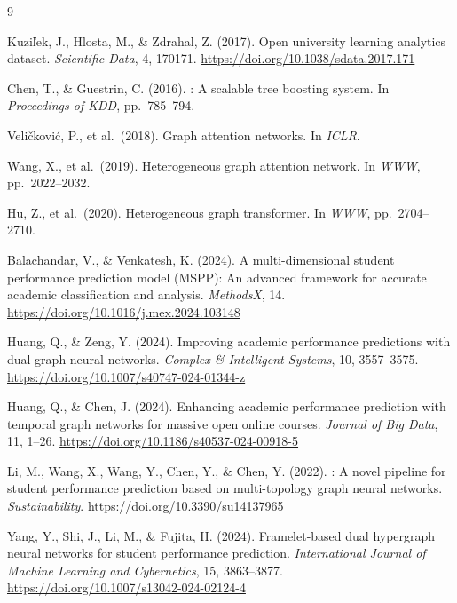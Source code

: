 \documentclass[sigconf]{acmart}
\begin{document}
\begin{thebibliography}{9}

Kuzi\v{l}ek, J., Hlosta, M., \& Zdrahal, Z. (2017).
\newblock Open university learning analytics dataset.
\newblock \emph{Scientific Data}, 4, 170171.
\newblock \url{https://doi.org/10.1038/sdata.2017.171}

Chen, T., \& Guestrin, C. (2016).
: A scalable tree boosting system.
\newblock In \emph{Proceedings of KDD}, pp.\ 785--794.

Veli\v{c}kovi\'{c}, P., et al.\ (2018).
\newblock Graph attention networks.
\newblock In \emph{ICLR}.

Wang, X., et al.\ (2019).
\newblock Heterogeneous graph attention network.
\newblock In \emph{WWW}, pp.\ 2022--2032.

Hu, Z., et al.\ (2020).
\newblock Heterogeneous graph transformer.
\newblock In \emph{WWW}, pp.\ 2704--2710.

Balachandar, V., \& Venkatesh, K. (2024).
\newblock A multi-dimensional student performance prediction model ({MSPP}):
  An advanced framework for accurate academic classification and analysis.
\newblock \emph{MethodsX}, 14.
\newblock \url{https://doi.org/10.1016/j.mex.2024.103148}

Huang, Q., \& Zeng, Y. (2024).
\newblock Improving academic performance predictions with dual graph neural
  networks.
\newblock \emph{Complex \& Intelligent Systems}, 10, 3557--3575.
\newblock \url{https://doi.org/10.1007/s40747-024-01344-z}

Huang, Q., \& Chen, J. (2024).
\newblock Enhancing academic performance prediction with temporal graph
  networks for massive open online courses.
\newblock \emph{Journal of Big Data}, 11, 1--26.
\newblock \url{https://doi.org/10.1186/s40537-024-00918-5}

Li, M., Wang, X., Wang, Y., Chen, Y., \& Chen, Y. (2022).
: A novel pipeline for student performance prediction
  based on multi-topology graph neural networks.
\newblock \emph{Sustainability}.
\newblock \url{https://doi.org/10.3390/su14137965}

Yang, Y., Shi, J., Li, M., \& Fujita, H. (2024).
\newblock Framelet-based dual hypergraph neural networks for student
  performance prediction.
\newblock \emph{International Journal of Machine Learning and Cybernetics},
  15, 3863--3877.
\newblock \url{https://doi.org/10.1007/s13042-024-02124-4}


\end{thebibliography}
\end{document}
